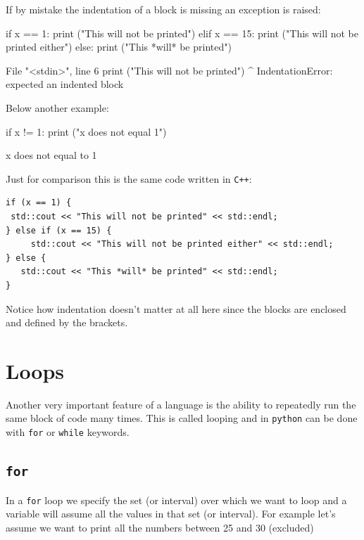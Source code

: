 If by mistake the indentation of a block is missing an exception is raised:

\begin{ipythonnon}
if x == 1:
    print ("This will not be printed")
elif x == 15:
    print ("This will not be printed either")
else:
   print ("This *will* be printed")
\end{ipythonnon}
\begin{ioutput}
  File "<stdin>", line 6
    print ("This will not be printed")
        ^
IndentationError: expected an indented block
\end{ioutput}

Below another example:
\begin{ipythonnon}
if x != 1:
    print ("x does not equal 1")
\end{ipythonnon}
\begin{ioutput}
x does not equal to 1	
\end{ioutput}

Just for comparison this is the same code written in \texttt{C++}:

\begin{lstlisting}[style=mycpp]
if (x == 1) {
 std::cout << "This will not be printed" << std::endl;
} else if (x == 15) {
     std::cout << "This will not be printed either" << std::endl;
} else {
   std::cout << "This *will* be printed" << std::endl;
}
\end{lstlisting}

Notice how indentation doesn't matter at all here since the blocks are enclosed and defined by the brackets.

\section{Loops}\label{loops}

Another very important feature of a language is the ability to repeatedly run the same block of code many times. This is called looping and in \texttt{python} can be done with \texttt{for} or \texttt{while} keywords.

\subsection{\texttt{for}}\label{for}

In a \texttt{for} loop we specify the set (or interval) over which we want to loop and a variable will assume all the values in that set (or interval). For example let's assume we want to print all the numbers between 25 and 30 (excluded) 

